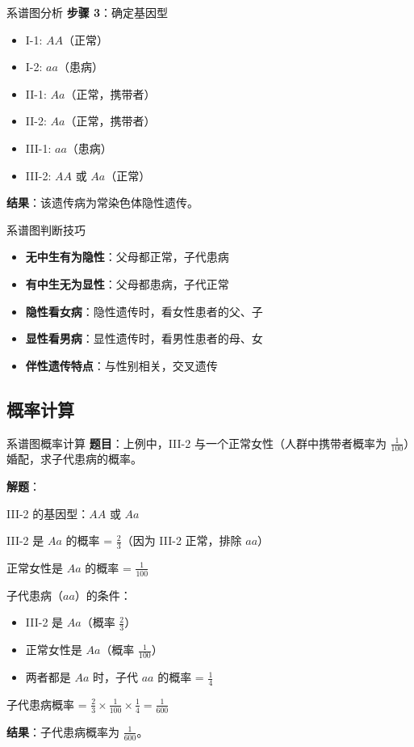 \documentclass[a4paper,11pt]{ctexart}
\begin{document}
\begin{examplebox}{系谱图分析}
\textbf{步骤 3}：确定基因型
\begin{itemize}[leftmargin=2em]
    \item I-1: $AA$（正常）
    \item I-2: $aa$（患病）
    \item II-1: $Aa$（正常，携带者）
    \item II-2: $Aa$（正常，携带者）
    \item III-1: $aa$（患病）
    \item III-2: $AA$ 或 $Aa$（正常）
\end{itemize}

\textbf{结果}：该遗传病为常染色体隐性遗传。
\end{examplebox}

\begin{lemmabox}{系谱图判断技巧}
\begin{itemize}[leftmargin=2em]
    \item \textbf{无中生有为隐性}：父母都正常，子代患病
    \item \textbf{有中生无为显性}：父母都患病，子代正常
    \item \textbf{隐性看女病}：隐性遗传时，看女性患者的父、子
    \item \textbf{显性看男病}：显性遗传时，看男性患者的母、女
    \item \textbf{伴性遗传特点}：与性别相关，交叉遗传
\end{itemize}
\end{lemmabox}

\subsection{概率计算}

\begin{examplebox}{系谱图概率计算}
\textbf{题目}：上例中，III-2 与一个正常女性（人群中携带者概率为 $\frac{1}{100}$）婚配，求子代患病的概率。

\textbf{解题}：

III-2 的基因型：$AA$ 或 $Aa$

III-2 是 $Aa$ 的概率 = $\frac{2}{3}$（因为 III-2 正常，排除 $aa$）

正常女性是 $Aa$ 的概率 = $\frac{1}{100}$

子代患病（$aa$）的条件：
\begin{itemize}[leftmargin=2em]
    \item III-2 是 $Aa$（概率 $\frac{2}{3}$）
    \item 正常女性是 $Aa$（概率 $\frac{1}{100}$）
    \item 两者都是 $Aa$ 时，子代 $aa$ 的概率 = $\frac{1}{4}$
\end{itemize}

子代患病概率 = $\frac{2}{3} \times \frac{1}{100} \times \frac{1}{4} = \frac{1}{600}$

\textbf{结果}：子代患病概率为 $\frac{1}{600}$。
\end{examplebox}
\end{document}
